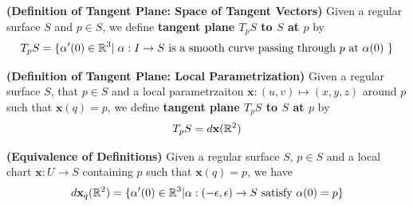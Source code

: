 \documentclass{report}
\begin{document}
\begin{definition}
\textbf{(Definition of Tangent Plane: Space of Tangent Vectors)} Given a regular surface $S$ and $p\in  S$, we define \textbf{tangent plane $T_pS$ to $S$ at $p$} by 
\begin{align*}
T_pS=\{ \alpha '(0)\in\mathbb{R}^3|\hspace{0.1cm}\alpha:I\rightarrow S \text{ is a smooth curve  passing through $p$ at $\alpha (0)$ } \}
\end{align*}
\end{definition}
\begin{definition}
\textbf{(Definition of Tangent Plane: Local Parametrization)} Given a regular surface $S$, that $p\in  S$ and a local parametrzaiton $\textbf{x}:(u,v)\mapsto  (x,y,z)$ around $p$ such that $\textbf{x}(q)=p$,  we define \textbf{tangent plane $T_pS$ to  $S$ at $p$} by 
\begin{align*}
T_pS=d\textbf{x}(\mathbb{R}^2)
\end{align*}
\end{definition}
\begin{theorem}
\textbf{(Equivalence of Definitions)} Given a regular surface $S$, $p\in  S $ and a local chart $\textbf{x}:U\rightarrow S$ containing $p$ such that $\textbf{x}(q)=p$, we have 
\begin{align*}
d\textbf{x}_q(\mathbb{R}^2)=\{ \alpha '(0)\in\mathbb{R}^3|\alpha:(-\epsilon ,\epsilon )\rightarrow S\text{ satisfy }\alpha (0)=p \}
\end{align*}
\end{theorem}
\end{document}
